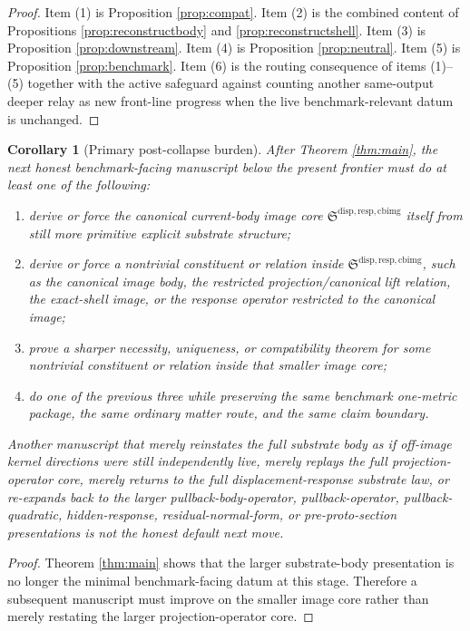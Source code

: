 \documentclass[11pt]{article}
\newcommand{\CurrentBodyImageCore}{\mathfrak S^{\mathrm{disp,resp,cbimg}}}
\newtheorem{corollary}{Corollary}
\begin{document}
\begin{proof}
Item (1) is Proposition \ref{prop:compat}. Item (2) is the combined content of Propositions \ref{prop:reconstructbody} and \ref{prop:reconstructshell}. Item (3) is Proposition \ref{prop:downstream}. Item (4) is Proposition \ref{prop:neutral}. Item (5) is Proposition \ref{prop:benchmark}. Item (6) is the routing consequence of items (1)--(5) together with the active safeguard against counting another same-output deeper relay as new front-line progress when the live benchmark-relevant datum is unchanged.
\end{proof}

\begin{corollary}[Primary post-collapse burden]
\label{cor:next}
After Theorem \ref{thm:main}, the next honest benchmark-facing manuscript below the present frontier must do at least one of the following:
\begin{enumerate}
    \item derive or force the canonical current-body image core \(\CurrentBodyImageCore\) itself from still more primitive explicit substrate structure;
    \item derive or force a nontrivial constituent or relation inside \(\CurrentBodyImageCore\), such as the canonical image body, the restricted projection/canonical lift relation, the exact-shell image, or the response operator restricted to the canonical image;
    \item prove a sharper necessity, uniqueness, or compatibility theorem for some nontrivial constituent or relation inside that smaller image core;
    \item do one of the previous three while preserving the same benchmark one-metric package, the same ordinary matter route, and the same claim boundary.
\end{enumerate}
Another manuscript that merely reinstates the full substrate body as if off-image kernel directions were still independently live, merely replays the full projection-operator core, merely returns to the full displacement-response substrate law, or re-expands back to the larger pullback-body-operator, pullback-operator, pullback-quadratic, hidden-response, residual-normal-form, or pre-proto-section presentations is not the honest default next move.
\end{corollary}

\begin{proof}
Theorem \ref{thm:main} shows that the larger substrate-body presentation is no longer the minimal benchmark-facing datum at this stage. Therefore a subsequent manuscript must improve on the smaller image core rather than merely restating the larger projection-operator core.
\end{proof}
\end{document}
